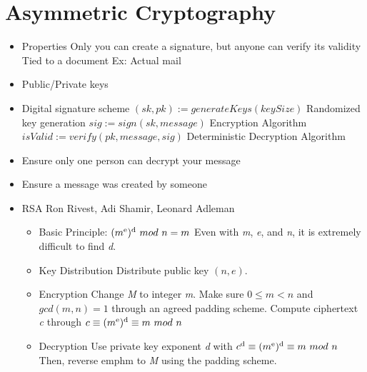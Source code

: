 \documentclass{article}
\begin{document}
\section*{Asymmetric Cryptography}
\begin{itemize}
  \item Properties
    \subitem Only you can create a signature, but anyone can verify its validity
    \subitem Tied to a document
    \subitem Ex: Actual mail
  \item Public/Private keys
  \item Digital signature scheme
    \subitem $ (sk, pk) := generateKeys(keySize) $ Randomized key generation
    \subitem $ sig := sign(sk, message) $ Encryption Algorithm
    \subitem $ isValid := verify(pk, message, sig) $ Deterministic Decryption Algorithm
  \item Ensure only one person can decrypt your message
  \item Ensure a message was created by someone
  \item RSA
    \subitem Ron Rivest, Adi Shamir, Leonard Adleman
    \begin{itemize}
      \item Basic Principle: $ (m\textsuperscript{e})\textsuperscript{d}\ mod\ n = m $
        \subitem Even with \emph{m}, \emph{e}, and \emph{n}, it is extremely difficult to find \emph{d}.
      \item Key Distribution
        \subitem Distribute public key $ (n, e) $. 
      \item Encryption
        \subitem Change \emph{M} to integer \emph{m}. Make sure $ 0 \leq m < n $ and $ gcd(m, n) = 1 $ through an agreed padding scheme.
        \subitem Compute ciphertext \emph{c} through $ c \equiv (m\textsuperscript{e})\textsuperscript{d} \equiv m\ mod\ n $
      \item Decryption
        \subitem Use private key exponent \emph{d} with $ c\textsuperscript{d} \equiv (m\textsuperscript{e})\textsuperscript{d} \equiv m\ mod\ n $
        \subitem Then, reverse emph{m} to \emph{M} using the padding scheme.


\end{itemize}
\end{itemize}
\end{document}
